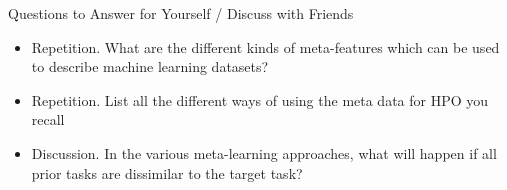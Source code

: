 \begin{frame}[c]{Questions to Answer for Yourself / Discuss with Friends}

\begin{itemize}
    \item \alert{Repetition.} What are the different kinds of meta-features which can be used to describe machine learning datasets?
    
    \medskip

    \item \alert{Repetition.} List all the different ways of using the meta data for HPO you recall
    \medskip

    \item \alert{Discussion.}
        In the various meta-learning approaches, what will happen if all prior tasks are dissimilar to the target task?


\end{itemize}

\end{frame}
